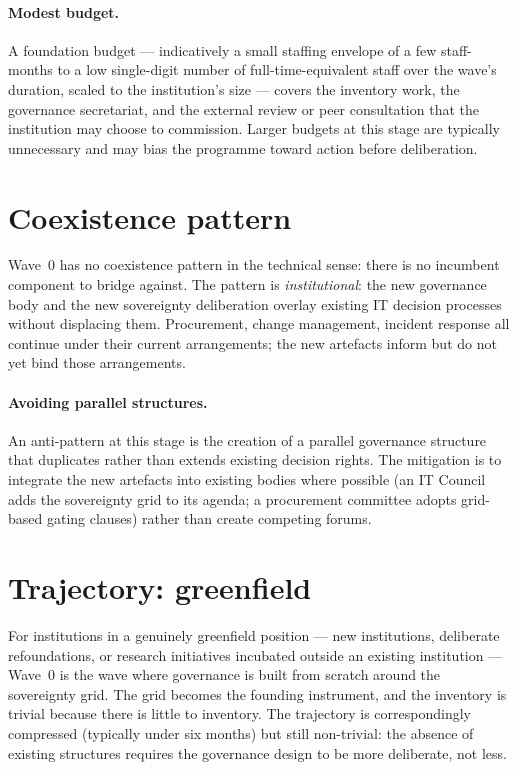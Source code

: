 \paragraph{Modest budget.} A foundation budget --- indicatively a
small staffing envelope of a few staff-months to a low single-digit
number of full-time-equivalent staff over the wave's duration,
scaled to the institution's size ---
covers the inventory work, the governance secretariat, and the
external review or peer consultation that the institution may
choose to commission. Larger budgets at this stage are typically
unnecessary and may bias the programme toward action before
deliberation.

\section{Coexistence pattern}
\label{sec:w0-coexistence}

Wave~0 has no coexistence pattern in the technical sense: there is
no incumbent component to bridge against. The pattern is
\emph{institutional}: the new governance body and the new sovereignty
deliberation overlay existing IT decision processes without
displacing them. Procurement, change management, incident response
all continue under their current arrangements; the new artefacts
inform but do not yet bind those arrangements.

\paragraph{Avoiding parallel structures.} An anti-pattern at this
stage is the creation of a parallel governance structure that
duplicates rather than extends existing decision rights. The
mitigation is to integrate the new artefacts into existing bodies
where possible (an IT Council adds the sovereignty grid to its
agenda; a procurement committee adopts grid-based gating clauses)
rather than create competing forums.

\section{Trajectory: greenfield}
\label{sec:w0-greenfield}

For institutions in a genuinely greenfield position --- new
institutions, deliberate refoundations, or research initiatives
incubated outside an existing institution --- Wave~0 is the wave
where governance is built from scratch around the sovereignty grid.
The grid becomes the founding instrument, and the inventory is
trivial because there is little to inventory. The trajectory is
correspondingly compressed (typically under six months) but still
non-trivial: the absence of existing structures requires the
governance design to be more deliberate, not less.

